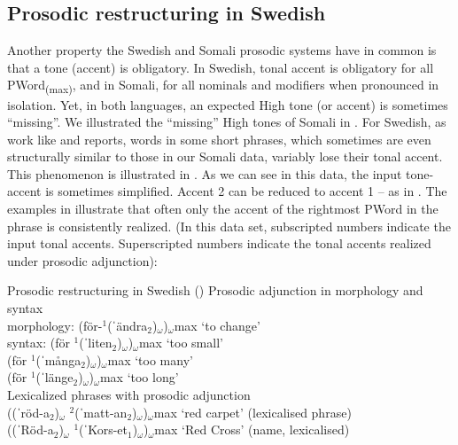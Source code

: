 \documentclass[output=paper]{langscibook}
\begin{document}
\subsection{Prosodic restructuring in Swedish}


Another property the Swedish and Somali prosodic systems have in common is that a tone (accent) is obligatory. In Swedish, tonal accent is obligatory for all PWord\textsubscript{(max)}, and in Somali, for all nominals and modifiers when pronounced in isolation. Yet, in both languages, an expected High tone (or accent) is sometimes ``missing''. We illustrated the ``missing'' High tones of Somali in . For Swedish, as work like \citet{Garlén1988,Myrberg2015} and \citet{Riad2016} reports, words in some short phrases, which sometimes are even structurally similar to those in our Somali data, variably lose their tonal accent. This phenomenon is illustrated in . As we can see in this data, the input tone-accent is sometimes simplified. Accent 2 can be reduced to accent 1 – as in . The examples in  illustrate that often only the accent of the rightmost PWord in the phrase is consistently realized. (In this data set, subscripted numbers indicate the input tonal accents. Superscripted numbers indicate the tonal accents realized under prosodic adjunction):
     
\ea  Prosodic restructuring in Swedish (\citealt{Myrberg2015}) \label{ex:downing:17}
\ea  Prosodic adjunction in morphology and syntax \label{ex:downing:17a}\\

  morphology:  (för-$^1$(ˈändra$_2$)$_ω$)$_ω$max   ‘to change’ \\

  syntax:  (för $^1$(ˈliten$_2$)$_ω$)$_ω$max  ‘too small’\\

      (för $^1$(ˈmånga$_2$)$_ω$)$_ω$max  ‘too many’\\

      (för $^1$(ˈlänge$_2$)$_ω$)$_ω$max  ‘too long’\\

\ex   Lexicalized phrases with prosodic adjunction\label{ex:downing:17b}\\

((ˈröd-a$_2$)$_ω$ $^2$(ˈmatt-an$_2$)$_ω$)$_ω$max  ‘red carpet’ (lexicalised phrase)\\

((ˈRöd-a$_2$)$_ω$ $^1$(ˈKors-et$_1$)$_ω$)$_ω$max   ‘Red Cross’ (name, lexicalised)\\
\end{document}

